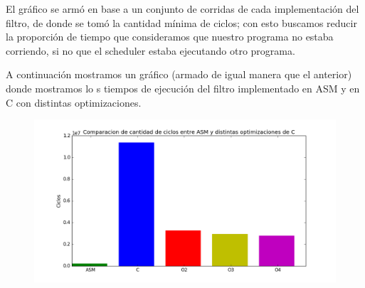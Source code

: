 	El gráfico se armó en base a un conjunto de corridas de cada implementación del filtro, de donde se tomó la cantidad mínima de ciclos; con esto buscamos reducir la proporción de tiempo que consideramos que nuestro programa no estaba corriendo, si no que el scheduler estaba ejecutando otro programa.
	
	A continuación mostramos un gráfico (armado de igual manera que el anterior) donde mostramos lo
s tiempos de ejecución del filtro implementado en ASM y en C con distintas optimizaciones.
	
\begin{figure}[h!]
	\includegraphics[width = 15 cm, height = 10 cm]{imagenes/rotarConC.png}
\end{figure}